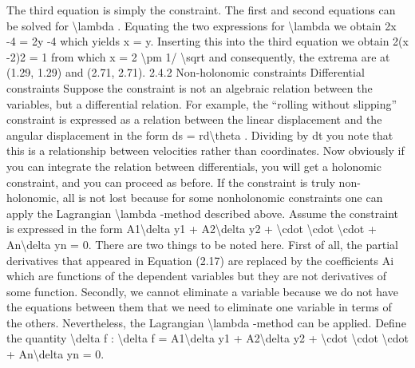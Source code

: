 \begin{example}
The third equation is simply the constraint. The first and second equations can
be solved for \textbackslash{}lambda . Equating the two expressions for \textbackslash{}lambda  we obtain
2x -4 =
2y -4
which yields x = y. Inserting this into the third equation we obtain
2(x -2)2 = 1
from which
x = 2 \textbackslash{}pm  1/
\textbackslash{}sqrt
and consequently, the extrema are at
(1.29, 1.29) and (2.71, 2.71).
2.4.2 Non-holonomic constraints
Differential constraints
Suppose the constraint is not an algebraic relation between the variables, but
a differential relation. For example, the ``rolling without slipping'' constraint is
expressed as a relation between the linear displacement and the angular displacement in the form
ds = rd\textbackslash{}theta .
Dividing by dt you note that this is a relationship between velocities rather
than coordinates. Now obviously if you can integrate the relation between differentials, you will get a holonomic constraint, and you can proceed as before.
If the constraint is truly non-holonomic, all is not lost because for some nonholonomic constraints one can apply the Lagrangian \textbackslash{}lambda -method described above.
Assume the constraint is expressed in the form
A1\textbackslash{}delta y1 + A2\textbackslash{}delta y2 + \textbackslash{}cdot  \textbackslash{}cdot  \textbackslash{}cdot  + An\textbackslash{}delta yn = 0.
There are two things to be noted here. First of all, the partial derivatives that
appeared in Equation (2.17) are replaced by the coefficients Ai which are functions of the dependent variables but they are not derivatives of some function.
Secondly, we cannot eliminate a variable because we do not have the equations
between them that we need to eliminate one variable in terms of the others.
Nevertheless, the Lagrangian \textbackslash{}lambda -method can be applied. Define the quantity \textbackslash{}delta f :
\textbackslash{}delta f = A1\textbackslash{}delta y1 + A2\textbackslash{}delta y2 + \textbackslash{}cdot  \textbackslash{}cdot  \textbackslash{}cdot  + An\textbackslash{}delta yn = 0.


\end{example}
